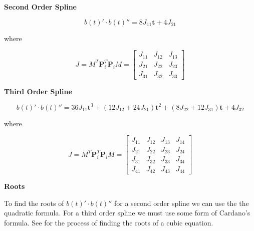 \documentclass{article}
\begin{document}
\hspace{1cm}

\textbf{Second Order Spline}

\hspace{1cm}

\begin{equation}
    b(t)' \cdot b(t)'' = 8J_{11}\textbf{t} + 4J_{21}
\end{equation}

where

\begin{equation}
    J = M^{T}\textbf{P}_i^{T}\textbf{P}_iM = \begin{bmatrix} J_{11} & J_{12} & J_{13} \\
                        J_{21} & J_{22} & J_{23} \\
                        J_{31} & J_{32} & J_{33} \end{bmatrix}
\end{equation}  

\hspace{1cm}

\textbf{Third Order Spline}

\hspace{1cm}

\begin{equation}
     b(t)' \cdot b(t)'' =  36J_{11}\textbf{t}^3 + (12J_{12} + 24J_{21})\textbf{t}^2 + (8J_{22} + 12J_{31})\textbf{t} + 4J_{32}
\end{equation}

where

\begin{equation}
    J = M^{T}\textbf{P}_i^{T}\textbf{P}_iM = \begin{bmatrix} J_{11} & J_{12} & J_{13} & J_{14} \\
                        J_{21} & J_{22} & J_{23} & J_{24} \\
                        J_{31} & J_{32} & J_{33} & J_{34} \\
                        J_{41} & J_{42} & J_{43} & J_{44}\end{bmatrix}
\end{equation}  

\hspace{1cm}

\textbf{Roots}

\hspace{1cm}

To find the roots of \(b(t)' \cdot b(t)''\) for a second order spline we can use the the quadratic formula. For a third order spline we must use some form of Cardano's formula. See \cite{WEBPAGE:Weisstein} for the process of finding the roots of a cubic equation.
\end{document}
